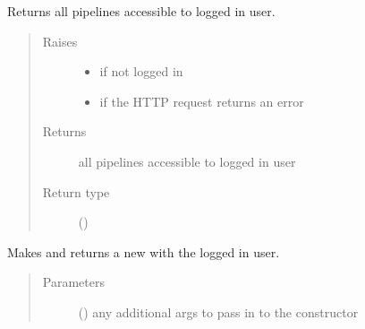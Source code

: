 \documentclass[letterpaper,10pt,english]{sphinxmanual}
\begin{document}
\begin{fulllineitems}
\begin{fulllineitems}
\label{\detokenize{autoapi/pine/client/client/index:pine.client.client.PineClient.get_pipelines}}
Returns all pipelines accessible to logged in user.
\begin{quote}\begin{description}
\item[{Raises}] \leavevmode\begin{itemize}
\item {} 
{\hyperref[\detokenize{autoapi/pine/client/exceptions/index:pine.client.exceptions.PineClientAuthException}]{}} \textendash{} if not logged in

\item {} 
{\hyperref[\detokenize{autoapi/pine/client/exceptions/index:pine.client.exceptions.PineClientHttpException}]{}} \textendash{} if the HTTP request returns an error

\end{itemize}

\item[{Returns}] \leavevmode
all pipelines accessible to logged in user

\item[{Return type}] \leavevmode
{}()

\end{description}\end{quote}

\end{fulllineitems}


\begin{fulllineitems}
\label{\detokenize{autoapi/pine/client/client/index:pine.client.client.PineClient.collection_builder}}
Makes and returns a new {\hyperref[\detokenize{autoapi/pine/client/models/index:pine.client.models.CollectionBuilder}]{}} with the logged in user.
\begin{quote}\begin{description}
\item[{Parameters}] \leavevmode
{} () \textendash{} any additional args to pass in to the constructor


\end{description}
\end{quote}
\end{fulllineitems}
\end{fulllineitems}
\end{document}
